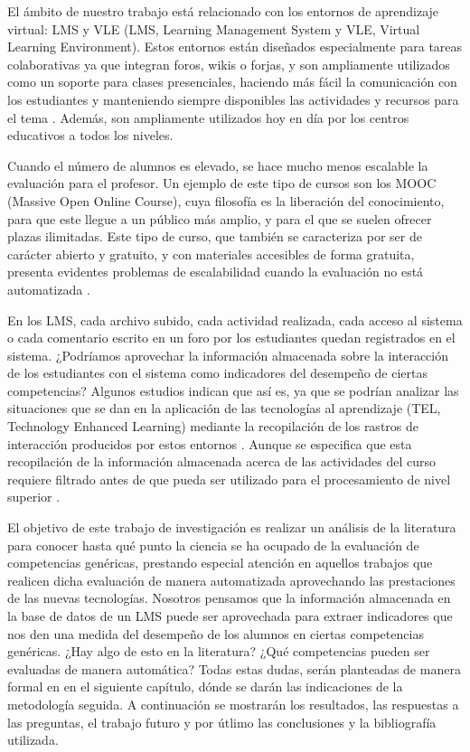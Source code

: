 El ámbito de nuestro trabajo está relacionado con los entornos de aprendizaje virtual: LMS y VLE (LMS, Learning Management System y VLE, Virtual Learning Environment). Estos entornos están diseñados especialmente para tareas colaborativas ya que integran foros, wikis o forjas, y son ampliamente utilizados como un soporte para clases presenciales, haciendo más fácil la comunicación con los estudiantes y manteniendo siempre disponibles las actividades y recursos para el tema \cite{Zafra:2011, Munkhchimeg:2013}. Además, son ampliamente utilizados hoy en día por los centros educativos a todos los niveles.

Cuando el número de alumnos es elevado, se hace mucho menos escalable la evaluación para el profesor. Un ejemplo de este tipo de cursos son los MOOC (Massive Open Online Course), cuya filosofía es la liberación del conocimiento, para que este llegue a un público más amplio, y para el que se suelen ofrecer plazas ilimitadas. Este tipo de curso, que también se caracteriza por ser de carácter abierto y gratuito, y con materiales accesibles de forma gratuita, presenta evidentes problemas de escalabilidad cuando la evaluación no está automatizada \cite{Johnson:2013}.

En los LMS, cada archivo subido, cada actividad realizada, cada acceso al sistema o cada comentario escrito en un foro por los estudiantes quedan registrados en el sistema. ¿Podríamos aprovechar la información almacenada sobre la interacción de los estudiantes con el sistema como indicadores del desempeño de ciertas competencias? Algunos estudios indican que así es, ya que se podrían analizar las situaciones que se dan en la aplicación de las tecnologías al aprendizaje (TEL, Technology Enhanced Learning) mediante la recopilación de los rastros de interacción producidos por estos entornos \cite{Chebil:2012}. Aunque se especifica que esta recopilación de la información almacenada acerca de las actividades del curso requiere filtrado antes de que pueda ser utilizado para el procesamiento de nivel superior \cite{Florian:2011}. 

El objetivo de este trabajo de investigación es realizar un análisis de la literatura para conocer hasta qué punto la ciencia se ha ocupado de la evaluación de competencias genéricas, prestando especial atención en aquellos trabajos que realicen dicha evaluación de manera automatizada aprovechando las prestaciones de las nuevas tecnologías. Nosotros pensamos que la información almacenada en la base de datos de un LMS puede ser aprovechada para extraer indicadores que nos den una medida del desempeño de los alumnos en ciertas competencias genéricas. ¿Hay algo de esto en la literatura? ¿Qué competencias pueden ser evaluadas de manera automática? Todas estas dudas, serán planteadas de manera formal en en el siguiente capítulo, dónde se darán las indicaciones de la metodología seguida. A continuación se mostrarán los resultados, las respuestas a las preguntas, el trabajo futuro y por útlimo las conclusiones y la bibliografía utilizada.




